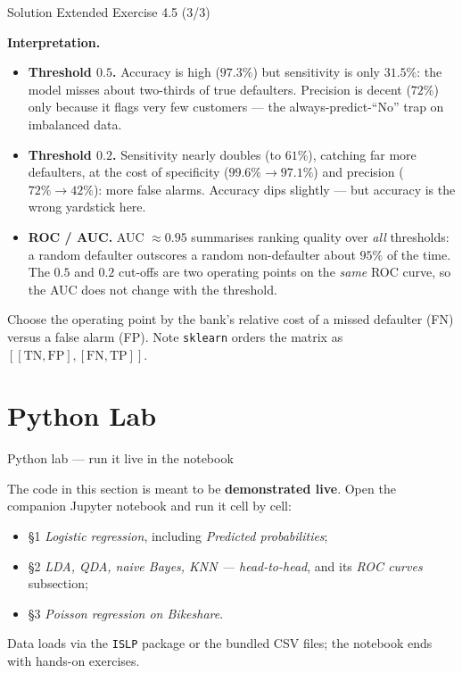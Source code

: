 \documentclass[aspectratio=169,11pt]{beamer}
\begin{document}
\begin{frame}{Solution \textemdash{} Extended Exercise 4.5 (3/3)}
\begin{solutionbox}
\textbf{Interpretation.}
\begin{itemize}
  \item \textbf{Threshold $0.5$.} Accuracy is high ($97.3\%$) but
        sensitivity is only $31.5\%$: the model misses about two-thirds of
        true defaulters. Precision is decent ($72\%$) only because it
        flags very few customers --- the always-predict-``No'' trap on
        imbalanced data.
  \item \textbf{Threshold $0.2$.} Sensitivity nearly doubles (to $61\%$),
        catching far more defaulters, at the cost of specificity
        ($99.6\%\!\to\!97.1\%$) and precision ($72\%\!\to\!42\%$): more
        false alarms. Accuracy dips slightly --- but accuracy is the wrong
        yardstick here.
  \item \textbf{ROC / AUC.} AUC $\approx 0.95$ summarises ranking quality
        over \emph{all} thresholds: a random defaulter outscores a random
        non-defaulter about $95\%$ of the time. The $0.5$ and $0.2$
        cut-offs are two operating points on the \emph{same} ROC curve, so
        the AUC does not change with the threshold.
\end{itemize}
Choose the operating point by the bank's relative cost of a missed
defaulter (FN) versus a false alarm (FP). Note \texttt{sklearn} orders the
matrix as $[[\mathrm{TN},\mathrm{FP}],[\mathrm{FN},\mathrm{TP}]]$.
\end{solutionbox}
\end{frame}

\section{Python Lab}

\begin{frame}{Python lab --- run it live in the notebook}
  \begin{labnote}
    The code in this section is meant to be \textbf{demonstrated live}. Open the companion Jupyter notebook and run it cell by cell:
    \begin{itemize}
      \item \S1 \emph{Logistic regression}, including \emph{Predicted probabilities};
      \item \S2 \emph{LDA, QDA, naive Bayes, KNN --- head-to-head}, and its \emph{ROC curves} subsection;
      \item \S3 \emph{Poisson regression on Bikeshare}.
    \end{itemize}
    Data loads via the \texttt{ISLP} package or the bundled CSV files; the notebook ends with hands-on exercises.
  \end{labnote}
\end{frame}
\end{document}
